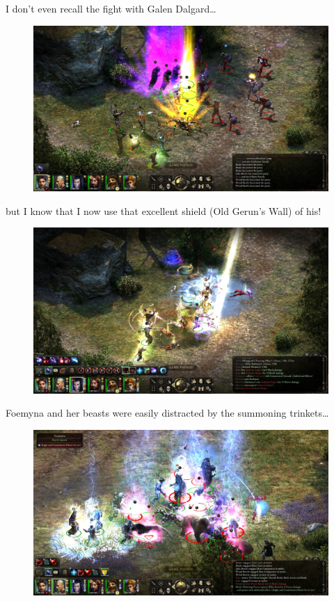 \documentclass{article}
\begin{document}
I don't even recall the fight with Galen Dalgard\ldots

\begin{figure}
\includegraphics[scale=0.33]{files/blog/2019_03_04_pillars_of_eternity_path_of_the_damned_act_iii/2019_03_04_galen1.jpg}
\end{figure}

but I know that I now use that excellent shield (Old Gerun's Wall) of his!

\begin{figure}
\includegraphics[scale=0.33]{files/blog/2019_03_04_pillars_of_eternity_path_of_the_damned_act_iii/2019_03_04_galen2.jpg}
\end{figure}

Foemyna and her beasts were easily distracted by the summoning trinkets\ldots

\begin{figure}
\includegraphics[scale=0.33]{files/blog/2019_03_04_pillars_of_eternity_path_of_the_damned_act_iii/2019_03_04_foemyna1.jpg}
\end{figure}
\end{document}
